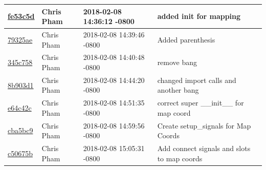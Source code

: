 \begin{center}
\begin{tabular}{l l l l}
\href{https://github.com/OSURoboticsClub/Rover_2017_2018/commit/fe53c5d5a73ac253acaef11fef448995f519cca8}{fe53c5d} & Chris Pham & 2018-02-08 14:36:12 -0800 &added init for mapping\\\hline
\href{https://github.com/OSURoboticsClub/Rover_2017_2018/commit/79325aefdf731ab4fcadc9dee58e3359e6c3b289}{79325ae} & Chris Pham & 2018-02-08 14:39:46 -0800 &Added parenthesis\\\hline
\href{https://github.com/OSURoboticsClub/Rover_2017_2018/commit/345c75886dfaf76865e56aedc130ec83f9dd8352}{345c758} & Chris Pham & 2018-02-08 14:40:48 -0800 &remove bang\\\hline
\href{https://github.com/OSURoboticsClub/Rover_2017_2018/commit/8b903d1299d30611ca22aaebc5267e874de4c004}{8b903d1} & Chris Pham & 2018-02-08 14:44:20 -0800 &changed import calls and another bang\\\hline
\href{https://github.com/OSURoboticsClub/Rover_2017_2018/commit/e64c42c45fa51556a9e4e2fba3f2e0450f75a134}{e64c42c} & Chris Pham & 2018-02-08 14:51:35 -0800 &correct super \_\_init\_\_ for map coord\\\hline
\href{https://github.com/OSURoboticsClub/Rover_2017_2018/commit/cba5bc9b39738a42df87b09cea98ffc9599b9617}{cba5bc9} & Chris Pham & 2018-02-08 14:59:56 -0800 &Create setup\_signals for Map Coords\\\hline
\href{https://github.com/OSURoboticsClub/Rover_2017_2018/commit/c50675b30154dfe9d87e9b7e2cb8d02caafc7397}{c50675b} & Chris Pham & 2018-02-08 15:05:31 -0800 &Add connect signals and slots to map coords\\\hline
\end{tabular}
\end{center}
